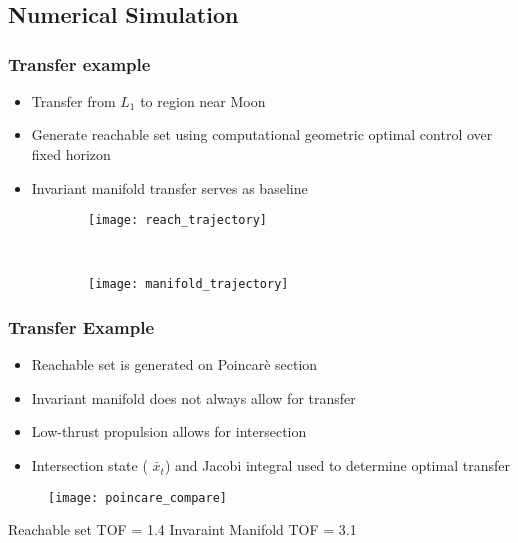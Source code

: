 \section*{}
\subsection*{Numerical Simulation}
\begin{frame} %
\frametitle{Transfer example}
\begin{itemize}
	\item Transfer from \( L_1 \) to region near Moon
	\item Generate reachable set using computational geometric optimal control over fixed horizon
	\item Invariant manifold transfer serves as baseline
\end{itemize}
	\begin{figure} 
	\centering 
	\begin{subfigure}[htbp]{0.5\textwidth} 
		\texttt{[image: reach\_trajectory]}  
	\end{subfigure}~
	\begin{subfigure}[htbp]{0.5\textwidth} 
		\texttt{[image: manifold\_trajectory]} 
	\end{subfigure} 
	\end{figure}
\end{frame} %

\begin{frame}%
\frametitle{Transfer Example}
\begin{itemize}
	\item Reachable set is generated on Poincar\`e section
	\item Invariant manifold does not always allow for transfer
	\item Low-thrust propulsion allows for intersection
	\item Intersection state ( \( \bar{x}_t \)) and Jacobi integral used to determine optimal transfer
\end{itemize}
\begin{figure}
	\texttt{[image: poincare\_compare]}
\end{figure}
	Reachable set TOF = 1.4
	Invaraint Manifold TOF = 3.1
\end{frame} %